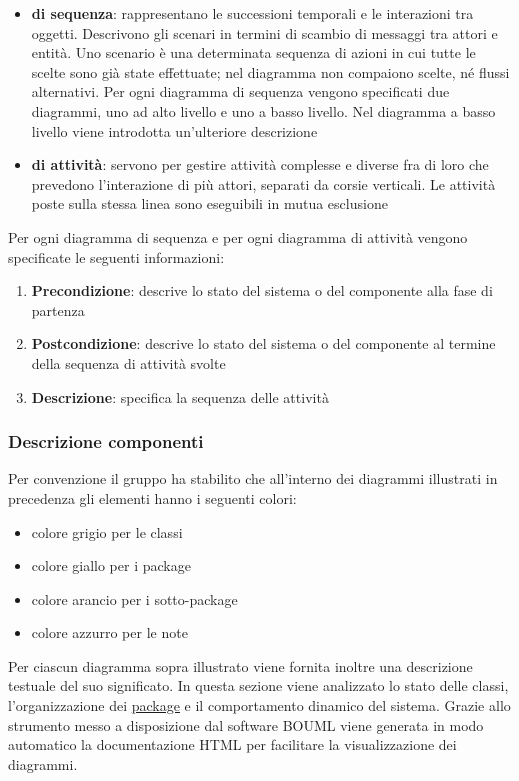 \documentclass[a4paper,11pt]{article}
\begin{document}
\begin{itemize}
\item \textbf{di sequenza}: rappresentano le successioni temporali e le interazioni tra oggetti. Descrivono gli scenari in termini di scambio di messaggi tra attori e entit\`a. Uno scenario \`e una determinata sequenza di azioni in cui tutte le scelte sono gi\`a state effettuate; nel diagramma non compaiono scelte, n\'e flussi alternativi. Per ogni diagramma di sequenza vengono specificati due diagrammi, uno ad alto livello e uno a basso livello. Nel diagramma a basso livello viene introdotta un'ulteriore descrizione
\item \textbf{di attivit\`a}: servono per gestire attivit\`a complesse e diverse fra di loro che prevedono l'interazione di pi\`u attori, separati da corsie verticali. Le attivit\`a poste sulla stessa linea sono eseguibili in mutua esclusione 
\end{itemize} 
Per ogni diagramma di sequenza e per ogni diagramma di attivit\`a vengono specificate le seguenti informazioni:
\begin{enumerate}
\item \textbf{Precondizione}: descrive lo stato del sistema o del componente alla fase di partenza
\item \textbf{Postcondizione}: descrive lo stato del sistema o del componente al termine della sequenza di attivit\`a svolte
\item \textbf{Descrizione}: specifica la sequenza delle attivit\`a
\end{enumerate}
\subsubsection{Descrizione componenti} 
Per convenzione il gruppo ha stabilito che all'interno dei diagrammi illustrati in precedenza gli elementi hanno i seguenti colori:
\begin{itemize}
\item colore grigio per le classi
\item colore giallo per i package
\item colore arancio per i sotto-package
\item colore azzurro per le note
\end{itemize}
Per ciascun diagramma sopra illustrato viene fornita inoltre una descrizione testuale del suo significato. In questa sezione viene analizzato lo stato delle classi, l'organizzazione dei \underline{package} e il comportamento dinamico del sistema. Grazie allo strumento messo a disposizione dal software BOUML viene generata in modo automatico la documentazione HTML per facilitare la visualizzazione dei diagrammi.  
\end{document}
